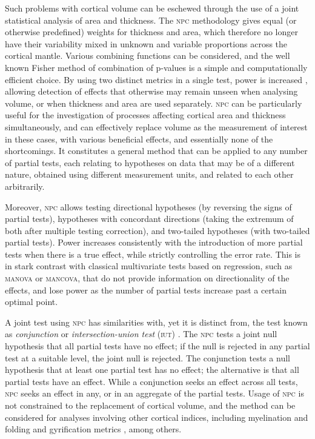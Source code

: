 Such problems with cortical volume can be eschewed through the use of a joint statistical analysis of area and thickness. The \textsc{npc} methodology gives equal (or otherwise predefined) weights for thickness and area, which therefore no longer have their variability mixed in unknown and variable proportions across the cortical mantle. Various combining functions can be considered, and the well known Fisher method of combination of p-values \citep{Fisher1932} is a simple and computationally efficient choice. By using two distinct metrics in a single test, power is increased \citep{Pesarin2010, Winkler2016_npc}, allowing detection of effects that otherwise may remain unseen when analysing volume, or when thickness and area are used separately. \textsc{npc} can be particularly useful for the investigation of processes affecting cortical area and thickness simultaneously, and can effectively replace volume as the measurement of interest in these cases, with various beneficial effects, and essentially none of the shortcomings. It constitutes a general method that can be applied to any number of partial tests, each relating to hypotheses on data that may be of a different nature, obtained using different measurement units, and related to each other arbitrarily.

Moreover, \textsc{npc} allows testing directional hypotheses (by reversing the signs of partial tests), hypotheses with concordant directions (taking the extremum of both after multiple testing correction), and two-tailed hypotheses (with two-tailed partial tests). Power increases consistently with the introduction of more partial tests when there is a true effect, while strictly controlling the error rate. This is in stark contrast with classical multivariate tests based on regression, such as \textsc{manova} or \textsc{mancova}, that do not provide information on directionality of the effects, and lose power as the number of partial tests increase past a certain optimal point.

A joint test using \textsc{npc} has similarities with, yet it is distinct from, the test known as \emph{conjunction} or \emph{intersection-union test} (\textsc{iut}) \citep{Nichols2005}. The \textsc{npc} tests a joint null hypothesis that all partial tests have no effect; if the null is rejected in any partial test at a suitable level, the joint null is rejected. The conjunction tests a null hypothesis that at least one partial test has no effect; the alternative is that all partial tests have an effect. While a conjunction seeks an effect across all tests, \textsc{npc} seeks an effect in any, or in an aggregate of the partial tests. Usage of \textsc{npc} is not constrained to the replacement of cortical volume, and the method can be considered for analyses involving other cortical indices, including myelination \citep{Glasser2011, Sereno2012} and folding and gyrification metrics \citep{Mangin2004, Schaer2008, Toro2008}, among others.


